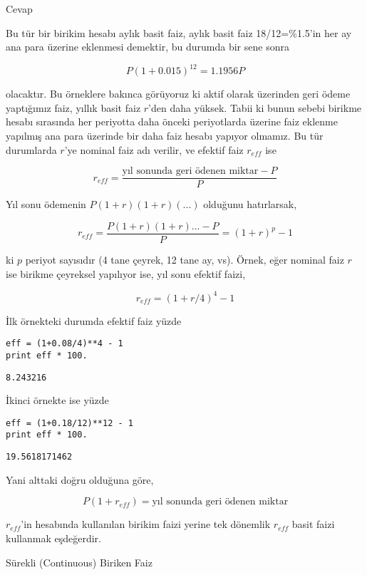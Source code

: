 \documentclass[12pt,fleqn]{article}\usepackage{../../common}
\begin{document}
Cevap

Bu tür bir birikim hesabı aylık basit faiz, aylık basit faiz 18/12=\%1.5'in her
ay ana para üzerine eklenmesi demektir, bu durumda bir sene sonra

$$ P(1+0.015)^{12} = 1.1956 P $$

olacaktır. Bu örneklere bakınca görüyoruz ki aktif olarak üzerinden geri ödeme
yaptığımız faiz, yıllık basit faiz $r$'den daha yüksek. Tabii ki bunun sebebi
birikme hesabı sırasında her periyotta daha önceki periyotlarda üzerine faiz
eklenme yapılmış ana para üzerinde bir daha faiz hesabı yapıyor olmamız. Bu tür
durumlarda $r$'ye nominal faiz adı verilir, ve efektif faiz $r_{eff}$ ise

$$ r_{eff} = \frac{\textrm{yıl sonunda geri ödenen miktar}-P}{P}$$

Yıl sonu ödemenin $P(1+r)(1+r)(...)$ olduğunu hatırlarsak,

$$
r_{eff}
= \frac{P(1+r)(1+r)... - P}{P}
= (1+r)^p-1
$$

ki $p$ periyot sayısıdır (4 tane çeyrek, 12 tane ay, vs). Örnek, eğer nominal
faiz $r$ ise birikme çeyreksel yapılıyor ise, yıl sonu efektif faizi,

$$ r_{eff} = (1+r/4)^4 -1  $$

İlk örnekteki durumda efektif faiz yüzde

\begin{verbatim}
eff = (1+0.08/4)**4 - 1 
print eff * 100.
\end{verbatim}

\begin{verbatim}
8.243216
\end{verbatim}

İkinci örnekte ise yüzde

\begin{verbatim}
eff = (1+0.18/12)**12 - 1 
print eff * 100.
\end{verbatim}

\begin{verbatim}
19.5618171462
\end{verbatim}

Yani alttaki doğru olduğuna göre,

$$ P(1+r_{eff}) = \textrm{yıl sonunda geri ödenen miktar} $$

$r_{eff}$'in hesabında kullanılan birikim faizi yerine tek dönemlik $r_{eff}$
basit faizi kullanmak eşdeğerdir.

Sürekli (Continuous) Biriken Faiz
\end{document}
